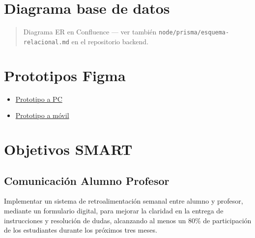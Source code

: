 \documentclass[
  spanish,
  11pt,
]{report}
\providecommand{\tightlist}{%
  \setlength{\itemsep}{0pt}\setlength{\parskip}{0pt}}
\begin{document}
\section{Diagrama base de datos}\label{diagrama-base-de-datos}

\begin{quote}
Diagrama ER en Confluence --- ver también
\texttt{node/prisma/esquema-relacional.md} en el repositorio backend.
\end{quote}

\section{Prototipos Figma}\label{prototipos-figma}

\begin{itemize}
\tightlist
\item
  \href{https://g-team-ddm5j4dr.atlassian.net/wiki/spaces/Ziryab/pages/2261253\#Prototipo-PC}{Prototipo
  a PC}
\item
  \href{https://www.figma.com/proto/j1rFThKhIcsvGUbp0JYK7U/Ziryab?page-id=0\%3A1&node-id=35-93&p=f&viewport=-3034\%2C71\%2C0.56&t=mgKuJhBCeqkAkSzV-1&scaling=scale-down&content-scaling=fixed&starting-point-node-id=35\%3A93}{Prototipo
  a móvil}
\end{itemize}

\section{Objetivos SMART}\label{objetivos-smart}

\subsection{Comunicación Alumno
Profesor}\label{comunicaciuxf3n-alumno-profesor}

Implementar un sistema de retroalimentación semanal entre alumno y
profesor, mediante un formulario digital, para mejorar la claridad en la
entrega de instrucciones y resolución de dudas, alcanzando al menos un
80\% de participación de los estudiantes durante los próximos tres
meses.
\end{document}
